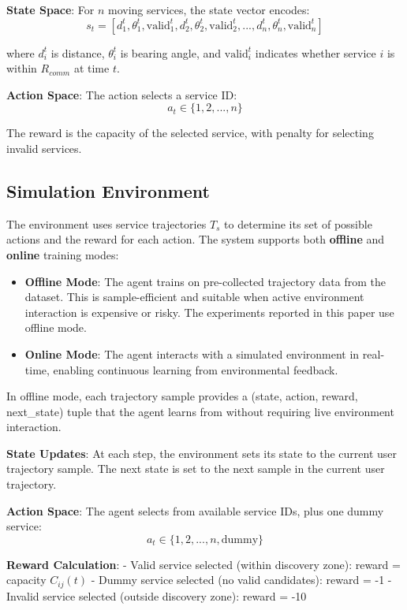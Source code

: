 \documentclass[10pt,twocolumn]{article}
\begin{document}
\textbf{State Space}: For \(n\) moving services, the state vector
encodes:
\[s_t = [d_1^t, \theta_1^t, \text{valid}_1^t, d_2^t, \theta_2^t, \text{valid}_2^t, ..., d_n^t, \theta_n^t, \text{valid}_n^t]\]

where \(d_i^t\) is distance, \(\theta_i^t\) is bearing angle, and
\(\text{valid}_i^t\) indicates whether service \(i\) is within
\(R_{comm}\) at time \(t\).

\textbf{Action Space}: The action selects a service ID:
\[a_t \in \{1, 2, ..., n\}\]

The reward is the capacity of the selected service, with penalty for
selecting invalid services.

\subsection{Simulation Environment}\label{simulation-environment}

The environment uses service trajectories \(T_s\) to determine its set
of possible actions and the reward for each action. The system supports
both \textbf{offline} and \textbf{online} training modes:

\begin{itemize}
	\item
	      \textbf{Offline Mode}: The agent trains on pre-collected trajectory
	      data from the dataset. This is sample-efficient and suitable when
	      active environment interaction is expensive or risky. The experiments
	      reported in this paper use offline mode.
	\item
	      \textbf{Online Mode}: The agent interacts with a simulated environment
	      in real-time, enabling continuous learning from environmental
	      feedback.
\end{itemize}

In offline mode, each trajectory sample provides a (state, action,
reward, next\_state) tuple that the agent learns from without requiring
live environment interaction.

\textbf{State Updates}: At each step, the environment sets its state to
the current user trajectory sample. The next state is set to the next
sample in the current user trajectory.

\textbf{Action Space}: The agent selects from available service IDs,
plus one dummy service: \[a_t \in \{1, 2, ..., n, \text{dummy}\}\]

\textbf{Reward Calculation}: - Valid service selected (within discovery
zone): reward = capacity \(C_{ij}(t)\) - Dummy service selected (no
valid candidates): reward = -1 - Invalid service selected (outside
discovery zone): reward = -10
\end{document}
